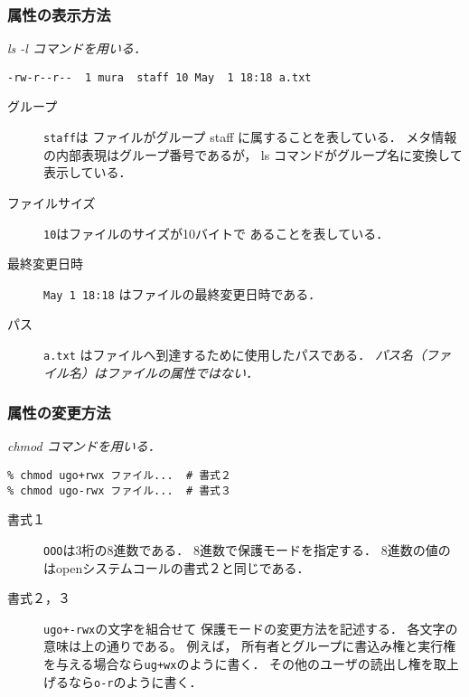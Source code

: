 \documentclass{beamer}                 %
\begin{document}
\begin{frame}[fragile]
  \frametitle{属性の表示方法}
  \emph{ls -l コマンドを用いる．}
  \begin{lstlisting}[numbers=none]
% ls -l a.txt
-rw-r--r--  1 mura  staff 10 May  1 18:18 a.txt
  \end{lstlisting}
\begin{description}
\item[グループ] \texttt{staff}は
ファイルがグループ staff に属することを表している．
メタ情報の内部表現はグループ番号であるが，
ls コマンドがグループ名に変換して表示している．
\item[ファイルサイズ] \texttt{10}はファイルのサイズが10バイトで
あることを表している．
\item[最終変更日時] \texttt{May 1 18:18} はファイルの最終変更日時である．
\item[パス] \texttt{a.txt} はファイルへ到達するために使用したパスである．
\emph{パス名（ファイル名）はファイルの属性ではない．}
\end{description}
\end{frame}

\begin{frame}[fragile]
  \frametitle{属性の変更方法}
  \emph{chmod コマンドを用いる．}\\
  \begin{minipage}{0.48\columnwidth}
  \begin{lstlisting}[numbers=none]
% chmod OOO ファイル...      # 書式１
% chmod ugo+rwx ファイル...  # 書式２
% chmod ugo-rwx ファイル...  # 書式３
  \end{lstlisting}
  \end{minipage}
  \begin{minipage}{0.48\columnwidth}
  \end{minipage}

\begin{description}
\item[書式１] \texttt{OOO}は3桁の8進数である．
8進数で保護モードを指定する．
8進数の値のはopenシステムコールの書式２と同じである．

\item[書式２，３] \texttt{ugo+-rwx}の文字を組合せて
保護モードの変更方法を記述する．
各文字の意味は上の通りである。
例えば，
所有者とグループに書込み権と実行権を与える場合なら\texttt{ug+wx}のように書く．
その他のユーザの読出し権を取上げるなら\texttt{o-r}のように書く．
\end{description}
\end{frame}
\end{document}
